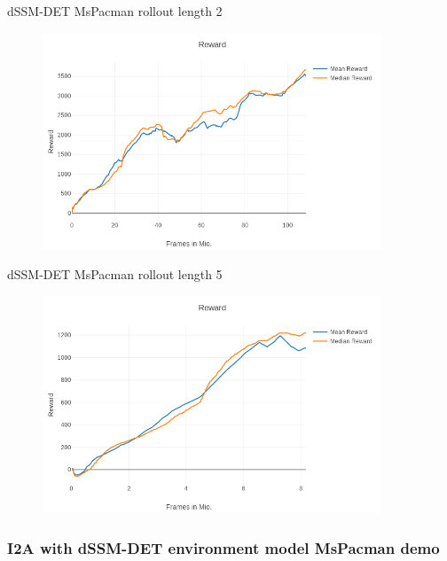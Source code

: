 \begin{frame}{dSSM-DET MsPacman rollout length 2}
	\vspace{-10mm}
    \begin{figure}
        \centering
        \includegraphics[width=0.9\textwidth]{./latent_i2a_images/dSSM_DET_MsPacman_100mio.png}
    \end{figure}
\end{frame}

\begin{frame}{dSSM-DET MsPacman rollout length 5}
	\vspace{-10mm}
    \begin{figure}
        \centering
        \includegraphics[width=0.9\textwidth]{./latent_i2a_images/MsPacman_dSSM_DET_5rollout.png}
    \end{figure}
\end{frame}


\begin{frame}
	\frametitle{I2A with dSSM-DET environment model MsPacman demo}
\end{frame}


